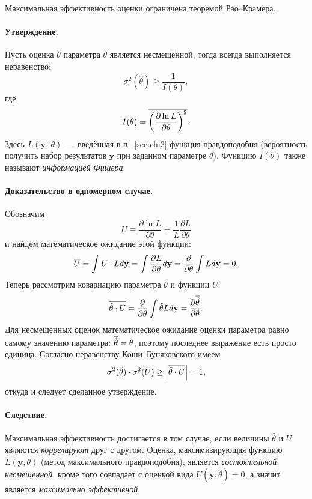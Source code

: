 Максимальная эффективность оценки ограничена теоремой Рао--Крамера.
\paragraph{Утверждение.}
Пусть оценка $\hat\theta$ параметра $\theta$ является несмещённой, тогда
всегда выполняется неравенство:
\begin{equation}
  \sigma^2(\hat\theta) \geq \frac{1}{I(\theta)},
\end{equation}
где
\begin{equation}
    I(\theta) =
    \overline{\left(\frac{\partial \ln L}{\partial \theta}\right)^2}.
\end{equation}
Здесь $L(\mathbf{y},\,\theta)$~--- введённая в п.~\ref{sec:chi2} функция правдоподобия
(вероятность получить набор результатов $\mathbf{y}$ при заданном параметре
$\theta$). Функцию $I(\theta)$ также называют \emph{информацией Фишера}.

\paragraph{Доказательство в одномерном случае.}
Обозначим
\[
U \equiv \frac{\partial \ln L} {\partial \theta} =
\frac{1}{L}\frac{\partial L}{\partial \theta}
\]
и найдём математическое ожидание этой функции:
\[
\overline{U} =
\int U\cdot L  d\mathbf{y} =
\int \frac{\partial L}{\partial \theta} d\mathbf{y} =
\frac{\partial}{\partial \theta} \int{L d\mathbf{y}} = 0.
\]
Теперь рассмотрим ковариацию параметра $\theta$ и функции
$U$:
\begin{equation}
\overline{\hat\theta\cdot U} 
= \frac{\partial}{\partial \theta} \int{\hat\theta L d\mathbf{y}} =
\frac{\partial \overline{\hat\theta}}{\partial \theta}.
\end{equation}
Для несмещенных оценок математическое ожидание оценки параметра равно
самому значению параметра: $\overline{\hat{\theta}} = \theta$,
поэтому последнее выражение есть просто единица.
Согласно неравенству Коши--Буняковского имеем
\[
\sigma^2 (\hat\theta) \cdot \sigma^2 (U) \geq
\left| \overline{\hat\theta \cdot U} \right| = 1,
\]
откуда и следует сделанное утверждение.

\paragraph{Следствие.}
Максимальная эффективность достигается в том случае, если величины
$\hat\theta$ и $U$ являются \emph{коррелируют} друг с другом.
Оценка, максимизирующая функцию $L(\mathbf{y},\theta)$
(метод максимального правдоподобия), является \emph{состоятельной},
\emph{несмещенной}, кроме того совпадает с оценкой вида
$U(\mathbf{y}, \hat\theta) = 0$, а значит является \emph{максимально эффективной}.

